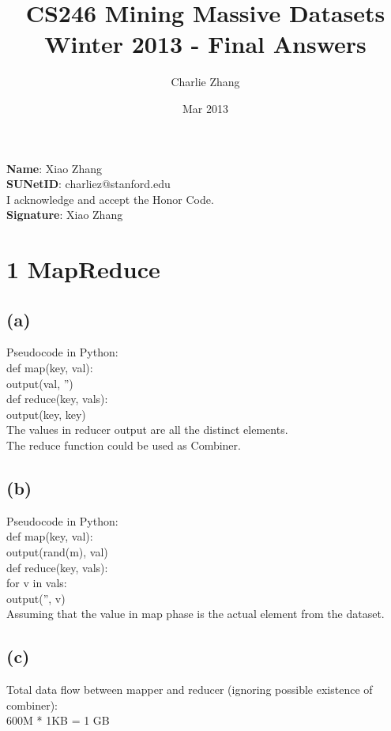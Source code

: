 \documentclass{article}
\title{CS246 Mining Massive Datasets Winter 2013 - Final Answers}
\author{Charlie Zhang}
\date{Mar 2013}
\begin{document}
\maketitle

\textbf{Name}: Xiao Zhang \\
\textbf{SUNetID}: charliez@stanford.edu \\

I acknowledge and accept the Honor Code. \\

\textbf{Signature}: Xiao Zhang


\section{1 MapReduce}
\subsection{(a)}
Pseudocode in Python: \\
def map(key, val): \\
\indent output(val, '') \\
def reduce(key, vals): \\
\indent output(key, key) \\

The values in reducer output are all the distinct elements. \\
The reduce function could be used as Combiner.

\subsection{(b)}
Pseudocode in Python: \\
def map(key, val): \\
\indent output(rand(m), val) \\
def reduce(key, vals): \\
\indent for v in vals: \\
\indent \indent output('', v) \\

Assuming that the value in map phase is the actual element from the dataset.

\subsection{(c)}
Total data flow between mapper and reducer (ignoring possible existence of combiner): \\
600M * 1KB = 1 GB \\
\end{document}
